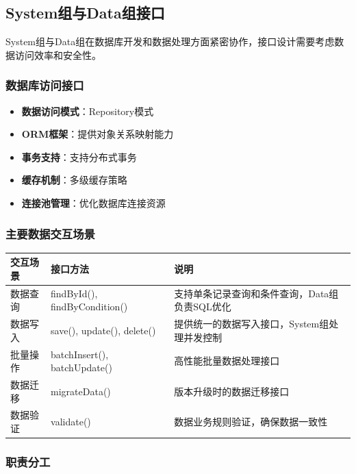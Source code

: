 \documentclass[a4paper,12pt]{article}
\begin{document}
\subsection{System组与Data组接口}

System组与Data组在数据库开发和数据处理方面紧密协作，接口设计需要考虑数据访问效率和安全性。

\subsubsection{数据库访问接口}

\begin{itemize}
  \item \textbf{数据访问模式}：Repository模式
  \item \textbf{ORM框架}：提供对象关系映射能力
  \item \textbf{事务支持}：支持分布式事务
  \item \textbf{缓存机制}：多级缓存策略
  \item \textbf{连接池管理}：优化数据库连接资源
\end{itemize}

\subsubsection{主要数据交互场景}

\begin{longtable}{|p{3cm}|p{4cm}|p{8cm}|}
\hline
\textbf{交互场景} & \textbf{接口方法} & \textbf{说明} \\
\hline
\endhead
数据查询 & findById(), findByCondition() & 支持单条记录查询和条件查询，Data组负责SQL优化 \\
\hline
数据写入 & save(), update(), delete() & 提供统一的数据写入接口，System组处理并发控制 \\
\hline
批量操作 & batchInsert(), batchUpdate() & 高性能批量数据处理接口 \\
\hline
数据迁移 & migrateData() & 版本升级时的数据迁移接口 \\
\hline
数据验证 & validate() & 数据业务规则验证，确保数据一致性 \\
\hline
\end{longtable}

\subsubsection{职责分工}
\end{document}
